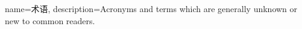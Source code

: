{
    name=术语,
    description={Acronyms and terms which are generally unknown or new to common readers.}
}
